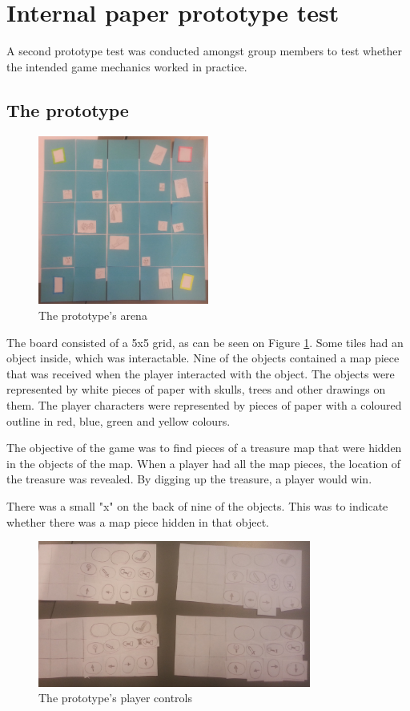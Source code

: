 \section{Internal paper prototype test}
A second prototype test was conducted amongst group members to test whether the intended game mechanics worked in practice.

\subsection{The prototype}
\begin{figure}[h] 
\centering 
\includegraphics[width=0.5\textwidth]{figures/PPtestArena}
\caption{The prototype's arena} \label{fig:PPtest1}
\end{figure}

The board consisted of a 5x5 grid, as can be seen on Figure \ref{fig:PPtest1}. Some tiles had an object inside, which was interactable. Nine of the objects contained a map piece that was received when the player interacted with the object. The objects were represented by white pieces of paper with skulls, trees and other drawings on them. The player characters were represented by pieces of paper with a coloured outline in red, blue, green and yellow colours.

The objective of the game was to find pieces of a treasure map that were hidden in the objects of the map. When a player had all the map pieces, the location of the treasure was revealed. By digging up the treasure, a player would win.


There was a small "x" on the back of nine of the objects. This was to indicate whether there was a map piece hidden in that object.

\begin{figure}[h]
\centering
\includegraphics[width=0.8\textwidth]{figures/PPtestControls}  
\caption{The prototype's player controls}\label{fig:PPtest2}
\end{figure}

